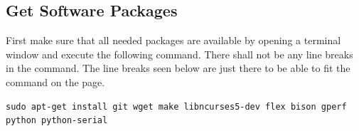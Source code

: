 \documentclass{tufte-book}
\begin{document}
	\subsection{Get Software Packages}
	First make sure that all needed packages are available by opening a terminal window and execute the following command. There shall not be any line breaks in the command. The line breaks seen below are just there to be able to fit the command on the page.
	
	\begin{lstlisting}
sudo apt-get install git wget make libncurses5-dev flex bison gperf python python-serial
	\end{lstlisting}
	

	 
	
\end{document}
